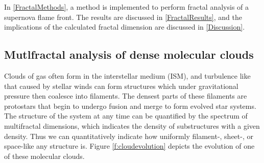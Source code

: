 \documentclass[iop]{emulateapj}
\begin{document}
In \textsection \ref{FractalMethods}, a method is implemented to perform fractal analysis of a supernova flame front. The results are discussed in \textsection \ref{FractalResults}, and the implications of the calculated fractal dimension are discussed in \textsection \ref{Discussion}.


\subsection{Mutlfractal analysis of dense molecular clouds}
Clouds of gas often form in the interstellar medium (ISM), and turbulence like that caused by stellar winds can form structures which under gravitational pressure then coalesce into filaments. The densest parts of these filaments are protostars that begin to undergo fusion and merge to form evolved star systems. The structure of the system at any time can be quantified by the spectrum of multifractal dimensions, which indicates the density of substructures with a given density. Thus we can quantitatively indicate how uniformly filament-, sheet-, or space-like any structure is. Figure \ref{f:cloudevolution} depicts the evolution of one of these molecular clouds.
\end{document}
